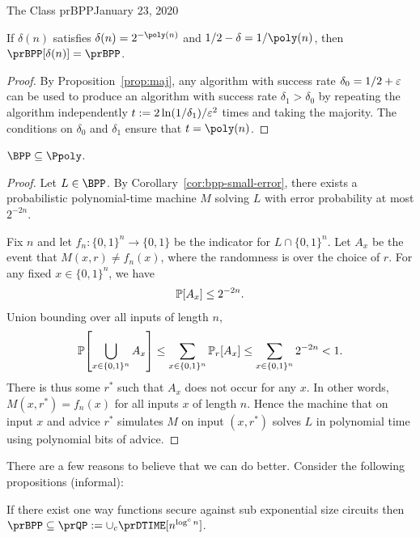 \begin{lecture}{1}{The Class prBPP}{January 23, 2020}
\begin{corollary}\label{cor:bpp-small-error}
  If $\delta(n)$ satisfies $\delta(n) = 2^{-\poly(n)}$ and $1/2 - \delta =
  1/\poly(n)$, then $\prBPP[\delta(n)] = \prBPP$.
\end{corollary}

\begin{proof}
  By Proposition~\ref{prop:maj}, any algorithm with success rate $\delta_0 =
  1/2 + \varepsilon$ can be used to produce an algorithm with success rate $\delta_1 >
  \delta_0$ by repeating the algorithm independently $t :=
  2\ln(1 / \delta_1)/\varepsilon^2$ times and taking the majority. The conditions on
  $\delta_0$ and $\delta_1$ ensure that $t = \poly(n)$.
\end{proof}

\begin{corollary}
  $\BPP \subseteq \Ppoly$.
\end{corollary}

\begin{proof}
    Let $L \in \BPP$. By Corollary~\ref{cor:bpp-small-error}, there exists a
    probabilistic polynomial-time machine $M$ solving $L$ with error
    probability at most $2^{-2n}$.

    Fix $n$ and let $f_n : \{0, 1\}^n \to \{0, 1\}$ be the indicator for $L
    \cap \{0, 1\}^n$. Let $A_x$ be the event that $M(x, r) \ne f_n(x)$, where
    the randomness is over the choice of $r$. For any fixed $x \in \{0, 1\}^n$,
    we have
    \begin{align*}
      \Pr\brac*{A_x} \leq 2^{-2n}.
    \end{align*}
    Union bounding over all inputs of length $n$, \[
      \Pr\brac*{\bigcup_{x \in \set{0, 1}^n} A_x}
      \leq \sum_{x \in \set{0,1}^n} \Pr_r\brac*{A_x}
      \leq \sum_{x \in \set{0,1}^n} 2^{-2n}
      < 1.
    \]
    There is thus some $r^*$ such that $A_x$ does not occur for any $x$. In
    other words, $M(x,r^*) = f_n(x)$ for all inputs $x$ of length $n$. Hence the
    machine that on input $x$ and advice $r^*$ simulates $M$ on input $(x,
    r^*)$ solves $L$ in polynomial time using polynomial bits of advice.
\end{proof}

There are a few reasons to believe that we can do better. Consider the following propositions (informal):

\begin{proposition}[BM82,GGM84]
	If there exist one way functions secure against sub exponential size circuits then $\prBPP \subseteq \prQP := \cup_c \prDTIME[n^{\log^c n}]$.
\end{proposition}


\end{lecture}
